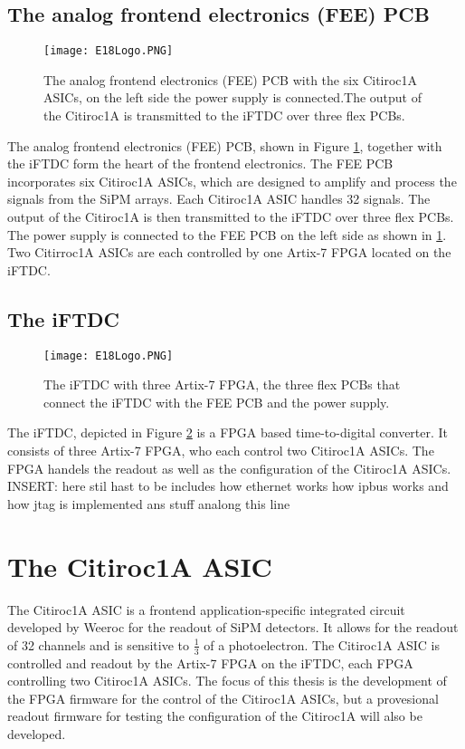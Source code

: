 \subsection{The analog frontend electronics (FEE) PCB}
\begin{figure}[H]
    \centering
    \texttt{[image: E18Logo.PNG]}
    \caption{The analog frontend electronics (FEE) PCB with the six Citiroc1A ASICs, on the left side the power supply is connected.The output of the Citiroc1A is transmitted to the iFTDC over three flex PCBs.\autocite{InternalcommunicationKarl}}
    \label{fig:FEE}
\end{figure}
The analog frontend electronics (FEE) PCB, shown in Figure \ref{fig:FEE}, together with the iFTDC form the heart of the frontend electronics.
The FEE PCB incorporates six Citiroc1A ASICs, which are designed to amplify and process the signals from the SiPM arrays.
 Each Citiroc1A ASIC handles 32 signals. The output of the Citiroc1A is then transmitted to the iFTDC over three flex PCBs.
The power supply is connected to the FEE PCB on the left side as shown in \ref{fig:FEE}. Two Citirroc1A ASICs are each controlled by one Artix-7 FPGA located on the iFTDC.\autocite{InternalcommunicationIgor}
\subsection{The iFTDC}\label{sec:iFTDC}
\begin{figure}[H]
    \centering
    \texttt{[image: E18Logo.PNG]}
    \caption{The iFTDC with three Artix-7 FPGA, the three flex PCBs that connect the iFTDC with the FEE PCB and the power supply.\autocite{InternalcommunicationIgor}}
    \label{fig:iFTDC}
\end{figure}

The iFTDC, depicted in Figure \ref{fig:iFTDC} is a FPGA based time-to-digital converter. It consists of three Artix-7 FPGA, who each control two Citiroc1A ASICs.
The FPGA handels the readout as well as the configuration of the Citiroc1A ASICs\autocite{InternalcommunicationIgor}.
\newline
INSERT: here stil hast to be includes how ethernet works how ipbus works and how jtag is implemented ans stuff analong this line 
\section{The Citiroc1A ASIC}
The Citiroc1A ASIC is a frontend application-specific integrated circuit developed by Weeroc for the readout of SiPM detectors.
It allows for the readout of 32 channels and is sensitive to $\frac{1}{3}$ of a photoelectron.\autocite{datasheetCITIROC}
\newline
The Citiroc1A ASIC is controlled and readout by the Artix-7 FPGA on the iFTDC, each FPGA controlling two Citiroc1A ASICs.\autocite{InternalcommunicationIgor}
The focus of this thesis is the development of the FPGA firmware for the control of the Citiroc1A ASICs,
 but a provesional readout firmware for testing the configuration of the Citiroc1A will also be developed.
